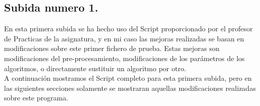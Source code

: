 	\subsection[Subida numero 1]{Subida numero 1.}
	
	En esta primera subida se ha hecho uso del Script proporcionado por el profesor de Practicas de la asignatura, y en mi caso las mejoras realizadas se basan en modificaciones sobre este primer fichero de prueba. Estas mejoras son modificaciones del pre-procesamiento, modificaciones de los parámetros de los algoritmos, o directamente sustituir un algoritmo por otro. \\
	
	A continuación mostramos el Script completo para esta primera subida, pero  en las siguientes secciones solamente se mostraran aquellas modificaciones 
	realizadas sobre este programa. 
	

